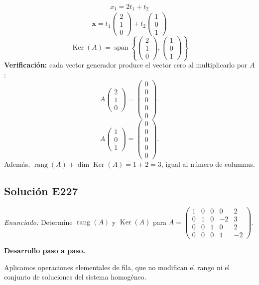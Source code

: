 \documentclass[12pt]{article}
\theoremstyle{remark}
\newcommand{\rang}{\operatorname{rang}}
\newcommand{\Ker}{\operatorname{Ker}}
\newcommand{\vect}[1]{\boldsymbol{#1}}
\newcommand{\solucion}[2]{\Needspace{11\baselineskip}\subsection*{Solución E#1}\noindent\textit{Enunciado:} #2\par\medskip\noindent\textbf{Desarrollo paso a paso.}\par\medskip}
\begin{document}
\[
\begin{aligned}x_{1}=2 t_{1} + t_{2}\end{aligned}
\]
\[
\vect x=t_{1}\begin{pmatrix}2\\1\\0\end{pmatrix} + t_{2}\begin{pmatrix}1\\0\\1\end{pmatrix}
\]
\[
\boxed{\Ker(A)=\operatorname{span}\left\{\begin{pmatrix}2\\1\\0\end{pmatrix},\begin{pmatrix}1\\0\\1\end{pmatrix}\right\}}
\]
\textbf{Verificación:} cada vector generador produce el vector cero al multiplicarlo por $A$:
\[
A\begin{pmatrix}2\\1\\0\end{pmatrix}=\begin{pmatrix}0\\0\\0\\0\\0\end{pmatrix}.
\]
\[
A\begin{pmatrix}1\\0\\1\end{pmatrix}=\begin{pmatrix}0\\0\\0\\0\\0\end{pmatrix}.
\]
Además, $\rang(A)+\dim\Ker(A)=1+2=3$, igual al número de columnas.


\medskip

\solucion{227}{Determine $\rang(A)$ y $\Ker(A)$ para $A=\begin{pmatrix}1&0&0&0&2\\0&1&0&-2&3\\0&0&1&0&2\\0&0&0&1&-2\end{pmatrix}$.}
Aplicamos operaciones elementales de fila, que no modifican el rango ni el conjunto de soluciones del sistema homogéneo.
\end{document}
